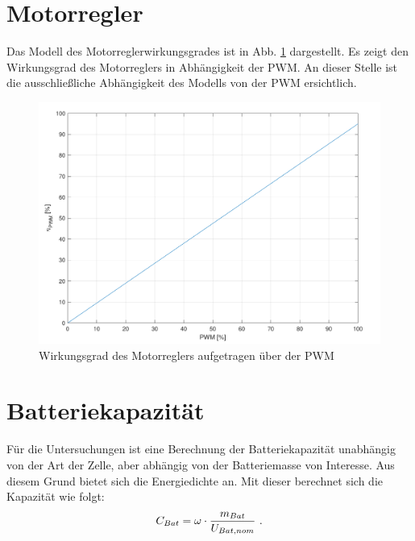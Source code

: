 \begin{appendix}
\section{Motorregler}
\label{sec:motorreglermodell}
Das Modell des Motorreglerwirkungsgrades ist in Abb. \ref{abb:motorreglermodell} dargestellt. Es zeigt den Wirkungsgrad des Motorreglers in Abhängigkeit der PWM. An dieser Stelle ist die ausschließliche Abhängigkeit des Modells von der PWM ersichtlich.
 
\begin{figure}[H]
\centering
	\includegraphics[scale=0.7]{Diagramme/Motorreglermodell.pdf}
	\caption{Wirkungsgrad des Motorreglers aufgetragen über der PWM}
	\label{abb:motorreglermodell}
\end{figure}


\section{Batteriekapazität}
Für die Untersuchungen ist eine Berechnung der Batteriekapazität unabhängig von der Art der Zelle, aber abhängig von der Batteriemasse von Interesse.
Aus diesem Grund bietet sich die Energiedichte an. 
Mit dieser berechnet sich die Kapazität wie folgt:
\begin{equation}
	C_{Bat}	= \omega\cdot\frac{m_{Bat}}{U_{Bat,nom}} ~\text{.}
	\label{eq:batteriekapazitaet}
\end{equation}



\end{appendix}
